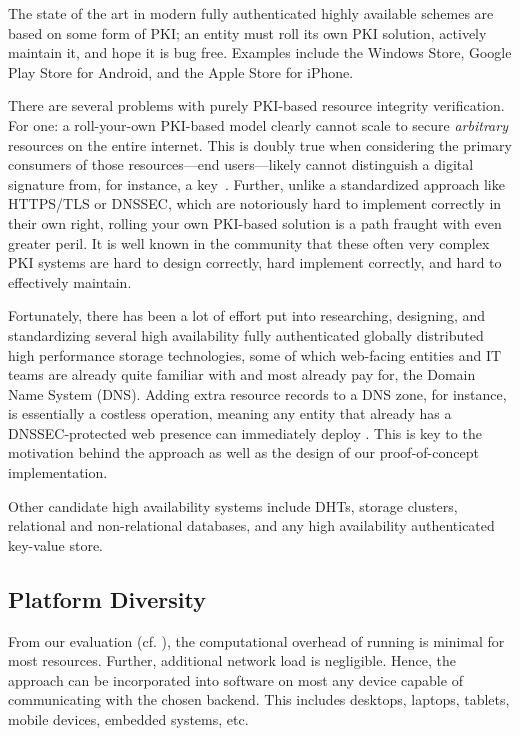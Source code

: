 The state of the art in modern fully authenticated highly available schemes are
based on some form of PKI; an entity must roll its own PKI solution,
actively maintain it, and hope it is bug free. Examples include the Windows
Store, Google Play Store for Android, and the Apple Store for iPhone.

There are several problems with purely PKI-based resource integrity
verification. For one: a roll-your-own PKI-based model clearly cannot scale to
secure \emph{arbitrary} resources on the entire internet. This is doubly true
when considering the primary consumers of those resources---end users---likely
cannot distinguish a digital signature from, for instance, a key~\cite{PGPBad}.
Further, unlike a standardized approach like HTTPS/TLS or DNSSEC, which are
notoriously hard to implement correctly in their own right, rolling your own
PKI-based solution is a path fraught with even greater peril. It is well known
in the community that these often very complex PKI systems are hard to design
correctly, hard implement correctly, and hard to effectively maintain.

Fortunately, there has been a lot of effort put into researching, designing, and
standardizing several high availability fully authenticated globally distributed
high performance storage technologies, some of which web-facing entities and IT
teams are already quite familiar with and most already pay for, \eg the Domain
Name System (DNS). Adding extra resource records to a DNS zone, for instance, is
essentially a costless operation, meaning any entity that already has a
DNSSEC-protected web presence can immediately deploy \SYSTEM{}. This is key to
the motivation behind the \SYSTEM{} approach as well as the design of our
\DNSSYS{} proof-of-concept implementation.

Other candidate high availability systems include DHTs, storage clusters,
relational and non-relational databases, and any high availability authenticated
key-value store.

\subsection{Platform Diversity}

From our evaluation (cf. ), the computational overhead of
running \SYSTEM{} is minimal for most resources. Further, additional network
load is negligible. Hence, the \SYSTEM{} approach can be incorporated into
software on most any device capable of communicating with the chosen backend.
This includes desktops, laptops, tablets, mobile devices, embedded systems, etc.


